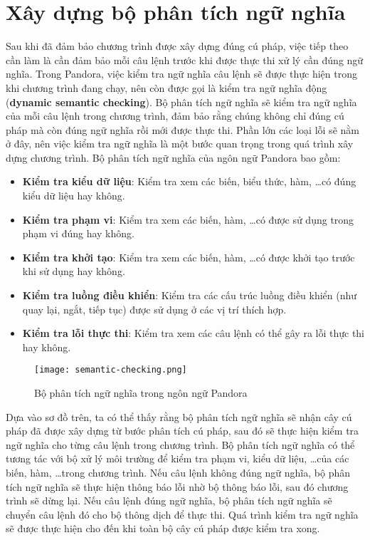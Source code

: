 \section{Xây dựng bộ phân tích ngữ nghĩa}

    Sau khi đã đảm bảo chương trình được xây dựng đúng cú pháp, việc tiếp theo cần làm là cần đảm bảo mỗi câu lệnh trước khi được thực thi xử lý cần đúng ngữ nghĩa. Trong Pandora, việc kiểm tra ngữ nghĩa câu lệnh sẽ được thực hiện trong khi chương trình đang chạy, nên còn được gọi là kiểm tra ngữ nghĩa động (\textbf{dynamic semantic checking}). Bộ phân tích ngữ nghĩa sẽ kiểm tra ngữ nghĩa của mỗi câu lệnh trong chương trình, đảm bảo rằng chúng không chỉ đúng cú pháp mà còn đúng ngữ nghĩa rồi mới được thực thi. Phần lớn các loại lỗi sẽ nằm ở đây, nên việc kiểm tra ngữ nghĩa là một bước quan trọng trong quá trình xây dựng chương trình. Bộ phân tích ngữ nghĩa của ngôn ngữ Pandora bao gồm:

\begin{itemize}
    \item \textbf{Kiểm tra kiểu dữ liệu}: Kiểm tra xem các biến, biểu thức, hàm, \dots có đúng kiểu dữ liệu hay không.
    \item \textbf{Kiểm tra phạm vi}: Kiểm tra xem các biến, hàm, \dots có được sử dụng trong phạm vi đúng hay không.
    \item \textbf{Kiểm tra khởi tạo}: Kiểm tra xem các biến, hàm, \dots có được khởi tạo trước khi sử dụng hay không.
    \item \textbf{Kiểm tra luồng điều khiển}: Kiểm tra các cấu trúc luồng điều khiển (như quay lại, ngắt, tiếp tục) được sử dụng ở các vị trí thích hợp.
    \item \textbf{Kiểm tra lỗi thực thi}: Kiểm tra xem các câu lệnh có thể gây ra lỗi thực thi hay không.
\end{itemize}

\begin{figure}[H]
    \centering
    \texttt{[image: semantic-checking.png]}
    \caption{Bộ phân tích ngữ nghĩa trong ngôn ngữ Pandora}
\end{figure}

    Dựa vào sơ đồ trên, ta có thể thấy rằng bộ phân tích ngữ nghĩa sẽ nhận cây cú pháp đã được xây dựng từ bước phân tích cú pháp, sau đó sẽ thực hiện kiểm tra ngữ nghĩa cho từng câu lệnh trong chương trình. Bộ phân tích ngữ nghĩa có thể tương tác với bộ xử lý môi trường để kiểm tra phạm vi, kiểu dữ liệu, \dots của các biến, hàm, \dots trong chương trình. Nếu câu lệnh không đúng ngữ nghĩa, bộ phân tích ngữ nghĩa sẽ thực hiện thông báo lỗi nhờ bộ thông báo lỗi, sau đó chương trình sẽ dừng lại. Nếu câu lệnh đúng ngữ nghĩa, bộ phân tích ngữ nghĩa sẽ chuyển câu lệnh đó cho bộ thông dịch để thực thi. Quá trình kiểm tra ngữ nghĩa sẽ được thực hiện cho đến khi toàn bộ cây cú pháp được kiểm tra xong.

